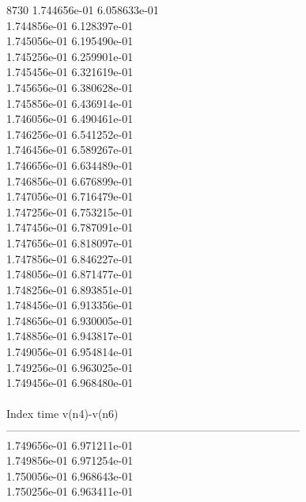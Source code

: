 8730	1.744656e-01	6.058633e-01	\\ 	1.744856e-01	6.128397e-01	\\ 	1.745056e-01	6.195490e-01	\\ 	1.745256e-01	6.259901e-01	\\ 	1.745456e-01	6.321619e-01	\\ 	1.745656e-01	6.380628e-01	\\ 	1.745856e-01	6.436914e-01	\\ 	1.746056e-01	6.490461e-01	\\ 	1.746256e-01	6.541252e-01	\\ 	1.746456e-01	6.589267e-01	\\ 	1.746656e-01	6.634489e-01	\\ 	1.746856e-01	6.676899e-01	\\ 	1.747056e-01	6.716479e-01	\\ 	1.747256e-01	6.753215e-01	\\ 	1.747456e-01	6.787091e-01	\\ 	1.747656e-01	6.818097e-01	\\ 	1.747856e-01	6.846227e-01	\\ 	1.748056e-01	6.871477e-01	\\ 	1.748256e-01	6.893851e-01	\\ 	1.748456e-01	6.913356e-01	\\ 	1.748656e-01	6.930005e-01	\\ 	1.748856e-01	6.943817e-01	\\ 	1.749056e-01	6.954814e-01	\\ 	1.749256e-01	6.963025e-01	\\ 	1.749456e-01	6.968480e-01	\\ \hline
\\ \hline
Index   time            v(n4)-v(n6)     \\ \hline
--------------------------------------------------------------------------------\\ 	1.749656e-01	6.971211e-01	\\ 	1.749856e-01	6.971254e-01	\\ 	1.750056e-01	6.968643e-01	\\ 	1.750256e-01	6.963411e-01	\\ \hline

